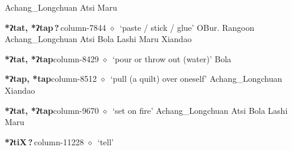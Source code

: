          Achang\_Longchuan 
\hspace{1ex}
         Atsi 
\hspace{1ex}
         Maru 
  \item {\footnotesize \textbf{*ʔtat, *ʔtap\,?\,}}{\tiny column-7844}
         $\diamond$~`paste / stick / glue'
         OBur. 
\hspace{1ex}
         Rangoon 
\hspace{1ex}
         Achang\_Longchuan 
\hspace{1ex}
         Atsi 
\hspace{1ex}
         Bola 
\hspace{1ex}
         Lashi 
\hspace{1ex}
         Maru 
\hspace{1ex}
         Xiandao 
  \item {\footnotesize \textbf{*ʔtat, *ʔtap}}{\tiny column-8429}
         $\diamond$~`pour or throw out (water)'
         Bola 
  \item {\footnotesize \textbf{*ʔtap, *tap}}{\tiny column-8512}
         $\diamond$~`pull (a quilt) over oneself'
         Achang\_Longchuan 
\hspace{1ex}
         Xiandao 
  \item {\footnotesize \textbf{*ʔtat, *ʔtap}}{\tiny column-9670}
         $\diamond$~`set on fire'
         Achang\_Longchuan 
\hspace{1ex}
         Atsi 
\hspace{1ex}
         Bola 
\hspace{1ex}
         Lashi 
\hspace{1ex}
         Maru 
  \item {\footnotesize \textbf{*ʔtiX\,?\,}}{\tiny column-11228}
         $\diamond$~`tell'
